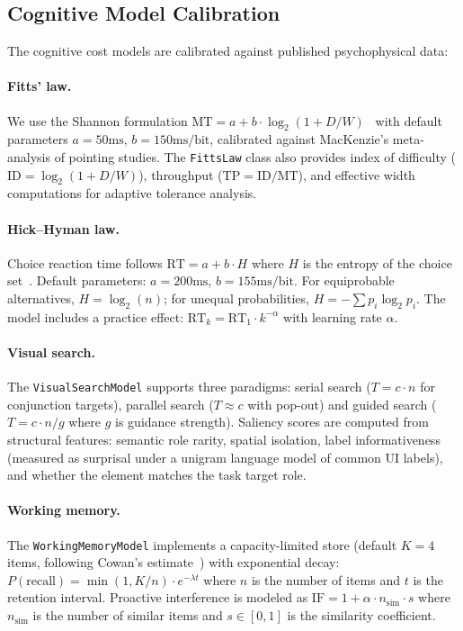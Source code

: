 \documentclass[11pt,twocolumn]{article}
\theoremstyle{definition}
\begin{document}
\subsection{Cognitive Model Calibration}
\label{sec:cognitive}

The cognitive cost models are calibrated against published psychophysical data:

\paragraph{Fitts' law.}
We use the Shannon formulation $\text{MT} = a + b \cdot \log_2(1 + D/W)$~\citep{mackenzie1992fitts} with default parameters $a = 50\text{ms}$, $b = 150\text{ms/bit}$, calibrated against MacKenzie's meta-analysis of pointing studies.
The \texttt{FittsLaw} class also provides index of difficulty ($\text{ID} = \log_2(1 + D/W)$), throughput ($\text{TP} = \text{ID}/\text{MT}$), and effective width computations for adaptive tolerance analysis.

\paragraph{Hick--Hyman law.}
Choice reaction time follows $\text{RT} = a + b \cdot H$ where $H$ is the entropy of the choice set~\citep{hick1952rate}.
Default parameters: $a = 200\text{ms}$, $b = 155\text{ms/bit}$.
For equiprobable alternatives, $H = \log_2(n)$; for unequal probabilities, $H = -\sum p_i \log_2 p_i$.
The model includes a practice effect: $\text{RT}_k = \text{RT}_1 \cdot k^{-\alpha}$ with learning rate $\alpha$.

\paragraph{Visual search.}
The \texttt{VisualSearchModel} supports three paradigms: serial search ($T = c \cdot n$ for conjunction targets), parallel search ($T \approx c$ with pop-out) and guided search ($T = c \cdot n / g$ where $g$ is guidance strength).
Saliency scores are computed from structural features: semantic role rarity, spatial isolation, label informativeness (measured as surprisal under a unigram language model of common UI labels), and whether the element matches the task target role.

\paragraph{Working memory.}
The \texttt{WorkingMemoryModel} implements a capacity-limited store (default $K=4$ items, following Cowan's estimate~\citep{cowan2001magical}) with exponential decay: $P(\text{recall}) = \min(1, K/n) \cdot e^{-\lambda t}$ where $n$ is the number of items and $t$ is the retention interval.
Proactive interference is modeled as $\text{IF} = 1 + \alpha \cdot n_{\text{sim}} \cdot s$ where $n_{\text{sim}}$ is the number of similar items and $s \in [0,1]$ is the similarity coefficient.
\end{document}
